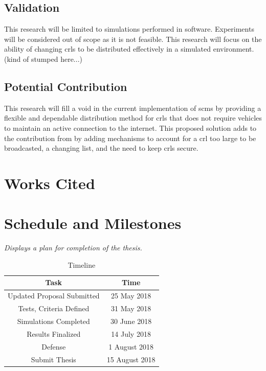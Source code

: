 \documentclass {article}
\newcommand{\sechint}[1]{\small{\emph{#1}} \bigskip}
\begin{document}
\subsection{Validation}
This research will be limited to simulations performed in software. Experiments will be considered out of scope as it is not feasible. This research will focus on the ability of changing \gls{crl}s to be distributed effectively in a simulated environment. (kind of stumped here...)

\subsection{Potential Contribution}
This research will fill a void in the current implementation of \gls{scms} by providing a flexible and dependable distribution method for \gls{crl}s that does not require vehicles to maintain an active connection to the internet. This proposed solution adds to the contribution from \autocite{haas_efficient_2011} by adding mechanisms to account for a \gls{crl} too large to be broadcasted, a changing list, and the need to keep \gls{crl}s secure.

\pagebreak
\section{Works Cited}
\printbibliography[title={\ }]

\pagebreak
\section{Schedule and Milestones}{\sechint{Displays a plan for completion of the thesis.}}

\begin{table}[!ht]
	\centering
	\begin{tabular}{c|c}
		\hline
		Task & Time \\ \hline \hline
		Updated Proposal Submitted & 25 May 2018 \\ \hline
		Tests, Criteria Defined & 31 May 2018 \\ \hline
		Simulations Completed & 30 June 2018 \\ \hline
		Results Finalized & 14 July 2018 \\ \hline
		Defense & 1 August 2018 \\ \hline
		Submit Thesis & 15 August 2018 \\ \hline
	\end{tabular}
	\caption{Timeline}
\end{table}
\end{document}
